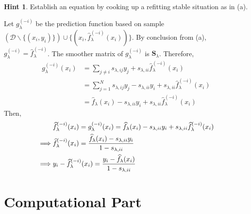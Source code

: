 \documentclass[10pt]{article}
\theoremstyle{definition}
\newtheorem*{hint}{Hint}
\theoremstyle{remark}
\newcommand{\Sbb}{\mathbf{S}}
\newcommand{\cD}{\mathcal{D}}
\begin{document}
\begin{enumerate}
\begin{itemize}
		\begin{hint}
			Establish an equation by cooking up a refitting stable situation as in (a).
		\end{hint}
		
		Let $g^{(-i)}_{\lambda}$ be the prediction function based on sample $( \cD \backslash \{ (x_{i},y_{i}) \} ) \cup \{ (x_{i},\widehat{f}^{(-i)}_{\lambda}(x_{i})) \}$. By conclusion from (a), $g^{(-i)}_{\lambda} = \widehat{f}^{(-i)}_{\lambda}$. The smoother matrix of $g^{(-i)}_{\lambda}$ is $ \Sbb_{\lambda}$. Therefore, 
		\begin{align*}
		    g^{(-i)}_{\lambda}(x_i) & = \sum_{j \ne i} s_{\lambda,ij} y_j + s_{\lambda,ii} \widehat{f}^{(-i)}_{\lambda}(x_{i}) \\
		    & = \sum_{j = 1}^{N} s_{\lambda,ij} y_j - s_{\lambda,ii} y_i + s_{\lambda,ii} \widehat{f}^{(-i)}_{\lambda}(x_{i}) \\
		    & = \widehat{f}_{\lambda}(x_{i}) - s_{\lambda,ii} y_i + s_{\lambda,ii} \widehat{f}^{(-i)}_{\lambda}(x_{i})
		\end{align*}
		Then,
		\begin{align*}
		    & \widehat{f}^{(-i)}_{\lambda}(x_i) = g^{(-i)}_{\lambda}(x_i) = \widehat{f}_{\lambda}(x_i) - s_{\lambda,ii}y_i + s_{\lambda,ii} \widehat{f}^{(-i)}_{\lambda}(x_i) \\
		    \implies & \widehat{f}^{(-i)}_{\lambda}(x_i) = \frac{\widehat{f}_{\lambda}(x_i) - s_{\lambda,ii}y_i}{1-s_{\lambda,ii}} \\
		    \implies & y_{i} - \widehat{f}^{(-i)}_{\lambda}(x_{i}) = {y_{i} - \widehat{f}_{\lambda}(x_{i}) \over 1 - s_{\lambda,ii}}
		\end{align*}
	\end{itemize}
	\end{enumerate}

\section*{Computational Part}
\end{document}
